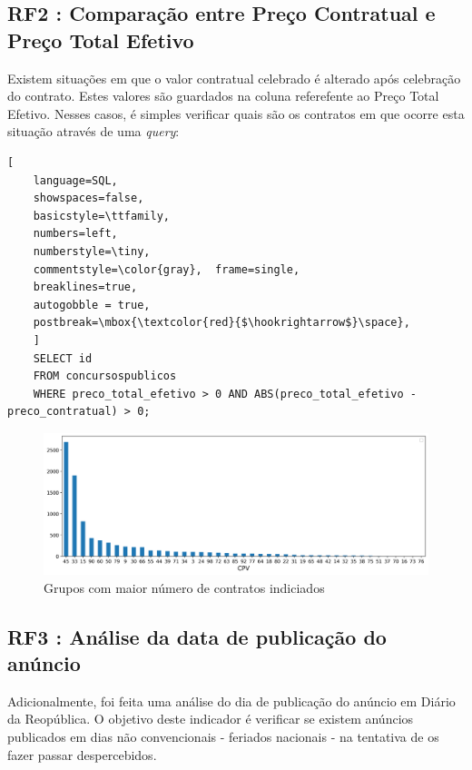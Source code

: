 \subsection{RF2 : Comparação entre Preço Contratual e Preço Total Efetivo}

Existem situações em que o valor contratual celebrado é alterado após celebração do contrato. Estes valores são guardados na coluna referefente ao Preço Total Efetivo. Nesses casos, é simples verificar quais são os contratos em que ocorre esta situação através de uma \textit{query}: 


\begin{lstlisting}[
	language=SQL,
	showspaces=false,
	basicstyle=\ttfamily,
	numbers=left,
	numberstyle=\tiny,
	commentstyle=\color{gray},	frame=single,
	breaklines=true,
	autogobble = true,
	postbreak=\mbox{\textcolor{red}{$\hookrightarrow$}\space},
	]
	SELECT id
	FROM concursospublicos 
	WHERE preco_total_efetivo > 0 AND ABS(preco_total_efetivo - preco_contratual) > 0;
\end{lstlisting}


\begin{figure}[H]
	\centering
	\includegraphics[width=\textwidth]{imagens/r059.png}
	\caption{Grupos com maior número de contratos indiciados}
	\label{}
\end{figure}



\subsection{RF3 : Análise da data de publicação do anúncio}

Adicionalmente, foi feita uma análise do dia de publicação do anúncio em Diário da Reopública. O objetivo deste indicador é verificar se existem anúncios publicados em dias não convencionais - feriados nacionais - na tentativa de os fazer passar despercebidos.


